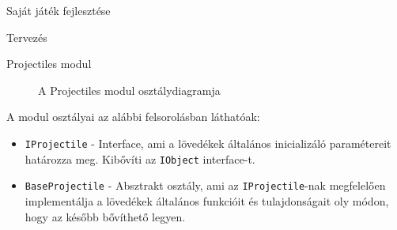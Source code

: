 \begin{MyChapter}{Saját játék fejlesztése}
\begin{MySection}{Tervezés}
\begin{MySubSection}{Projectiles modul}
			\begin{figure}[h!]
				\centering
				\caption{A Projectiles modul osztálydiagramja}
				\label{fig:uml:projectile}
			\end{figure}
			
			A modul osztályai az alábbi felsorolásban láthatóak:
			\begin{itemize}
				\item \texttt{IProjectile} - Interface, ami a lövedékek általános inicializáló paramétereit határozza meg. Kibővíti az \texttt{IObject} interface-t.

				\item \texttt{BaseProjectile} - Absztrakt osztály, ami az \texttt{IProjectile}-nak megfelelően implementálja a lövedékek általános funkcióit és tulajdonságait oly módon, hogy az később bővíthető legyen.


\end{itemize}
\end{MySubSection}
\end{MySection}
\end{MyChapter}
